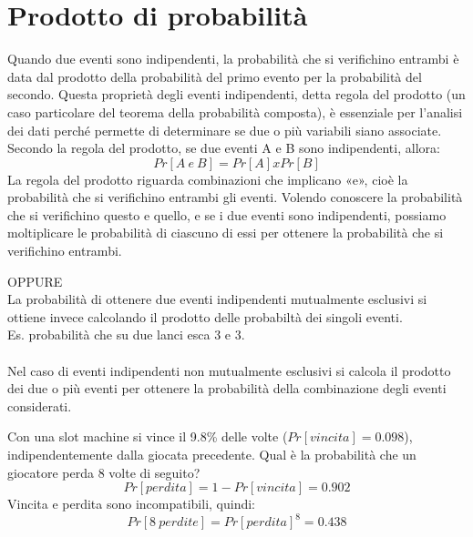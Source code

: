 \documentclass[drafts, 10pt]{book}
\newcounter{example}[section]
\begin{document}
\section{Prodotto di probabilità\label{secprodottodiprobabilità}}
Quando due eventi sono indipendenti, la probabilità che si verifichino entrambi è data dal prodotto della probabilità del primo evento per la probabilità del secondo. Questa proprietà degli eventi indipendenti, detta regola del prodotto (un caso particolare del teorema della probabilità composta), è essenziale per l'analisi dei dati perché permette di determinare se due o più variabili siano associate.
\\
Secondo la regola del prodotto, se due eventi A e B sono indipendenti, allora:
\begin{equation}
    Pr[A\ e\ B] = Pr[A] x Pr[B] 
\end{equation}
La regola del prodotto riguarda combinazioni che implicano «e», cioè la probabilità che si verifichino entrambi gli eventi. Volendo conoscere la probabilità che si verifichino questo e quello, e se i due eventi sono indipendenti, possiamo moltiplicare le probabilità di ciascuno di essi per ottenere la probabilità che si verifichino entrambi.
\\
\colorbox{lyellow}{\parbox{\textwidth}{OPPURE
\\
La probabilità di ottenere due eventi indipendenti mutualmente esclusivi si ottiene invece calcolando il prodotto delle probabiltà dei singoli eventi.
\\
Es. probabilità che su due lanci esca 3 e 3.
\\
\\
Nel caso di eventi indipendenti non mutualmente esclusivi si calcola il prodotto dei due o più eventi per ottenere la probabilità della combinazione degli eventi considerati.}}
\begin{example}
    Con una slot machine si vince il 9.8\% delle volte ($Pr[vincita] = 0.098$), indipendentemente dalla giocata precedente.
    Qual è la probabilità che un giocatore perda 8 volte di seguito?
    \begin{equation}
        Pr[perdita] = 1 - Pr[vincita] = 0.902
    \end{equation}
    Vincita e perdita sono incompatibili, quindi:
    \begin{equation}
        Pr[8\ perdite] = Pr[perdita]^8 = 0.438
    \end{equation}
\end{example}
\end{document}
